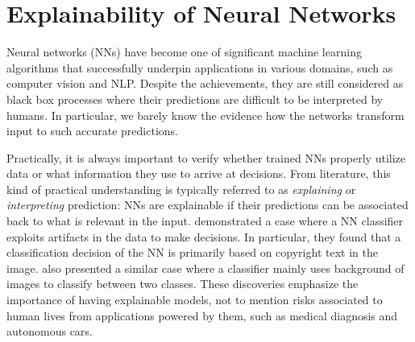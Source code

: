 \section{Explainability of Neural Networks}
Neural networks (NNs) have become one of significant machine learning algorithms that successfully underpin applications in various domains, such as  computer vision and NLP. Despite the achievements, they are still considered as black box processes where their predictions are difficult to be interpreted by  humans. In particular, we barely know the evidence how the networks transform input to such accurate predictions.

%  
%
%

%


Practically, it is always important to verify whether trained NNs properly utilize data or what information they use to arrive at decisions. From literature, this kind of practical understanding is typically referred to as \textit{explaining} or \textit{interpreting} prediction: NNs are explainable if their predictions can be associated back to what is relevant in the input. \citet{BachAnalyzingclassifiersFisher2016} demonstrated a case where a NN classifier exploits artifacts in the data to make decisions. In particular, they found that  a classification decision of the NN is primarily based on copyright text in the image. \citet{RibeiroWhyShouldTrust2016} also presented a similar case where a classifier mainly uses background of images to classify between two classes. These discoveries emphasize the importance of having explainable models, not to mention risks associated to human lives from applications powered by them, such as medical diagnosis and autonomous cars.
%

